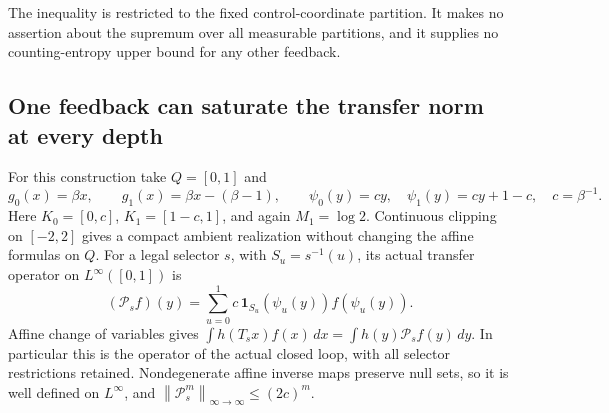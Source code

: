 \documentclass[11pt,reqno]{amsart}
\numberwithin{equation}{section}
\theoremstyle{definition}
\newcommand{\one}{\mathbf 1}
\newcommand{\opnorm}[1]{\left\|#1\right\|_{\infty\to\infty}}
\begin{document}
The inequality is restricted to the fixed control-coordinate
partition. It makes no assertion about the supremum over all
measurable partitions, and it supplies no counting-entropy upper
bound for any other feedback.

\subsection{One feedback can saturate the transfer norm at every depth}

For this construction take $Q=[0,1]$ and
\[
 g_0(x)=\beta x,\qquad g_1(x)=\beta x-(\beta-1),\qquad
 \psi_0(y)=cy,\quad\psi_1(y)=cy+1-c,\quad c=\beta^{-1}.
\]
Here $K_0=[0,c]$, $K_1=[1-c,1]$, and again $M_1=\log2$. Continuous clipping on $[-2,2]$ gives a compact ambient realization without changing the affine formulas on $Q$.
For a legal selector $s$, with $S_u=s^{-1}(u)$, its actual
transfer operator on $L^\infty([0,1])$ is
\[
 (\mathcal P_sf)(y)=
 \sum_{u=0}^1c\,\one_{S_u}(\psi_u(y))f(\psi_u(y)).
\]
Affine change of variables gives
$\int h(T_sx)f(x)\,dx=\int h(y)\mathcal P_sf(y)\,dy$.
In particular this is the operator of the actual closed loop,
with all selector restrictions retained. Nondegenerate affine inverse maps preserve null sets, so it is well defined on $L^\infty$, and
$\opnorm{\mathcal P_s^m}\le(2c)^m$.
\end{document}
